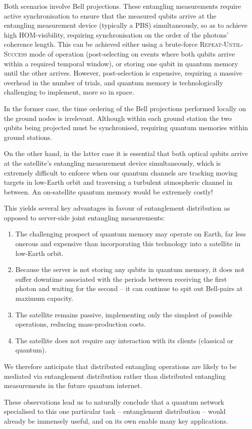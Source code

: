 Both scenarios involve Bell projections. These entangling measurements require active synchronisation to ensure that the measured qubits arrive at the entangling measurement device (typically a PBS) simultaneously, so as to achieve high HOM-visibility, requiring synchronisation on the order of the photons' coherence length. This can be achieved either using a brute-force \textsc{Repeat-Until-Success} mode of operation (post-selecting on events where both qubits arrive within a required temporal window), or storing one qubit in quantum memory until the other arrives. However, post-selection is expensive, requiring a massive overhead in the number of trials, and quantum memory is technologically challenging to implement, more so in space.

In the former case, the time ordering of the Bell projections performed locally on the ground nodes is irrelevant. Although within each ground station the two qubits being projected must be synchronised, requiring quantum memories within ground stations.

On the other hand, in the latter case it is essential that both optical qubits arrive at the satellite's entangling measurement device simultaneously, which is extremely difficult to enforce when our quantum channels are tracking moving targets in low-Earth orbit and traversing a turbulent atmospheric channel in between. An on-satellite quantum memory would be extremely costly!

This yields several key advantages in favour of entanglement distribution as opposed to server-side joint entangling measurements:
\begin{enumerate}
	\item The challenging prospect of quantum memory may operate on Earth, far less onerous and expensive than incorporating this technology into a satellite in low-Earth orbit.
	\item Because the server is not storing any qubits in quantum memory, it does not suffer downtime associated with the periods between receiving the first photon and waiting for the second -- it can continue to spit out Bell-pairs at maximum capacity.
	\item The satellite remains passive, implementing only the simplest of possible operations, reducing mass-production costs.
	\item The satellite does not require any interaction with its clients (classical or quantum).
\end{enumerate}

We therefore anticipate that distributed entangling operations are likely to be mediated via entanglement distribution rather than distributed entangling measurements in the future quantum internet.

These observations lead us to naturally conclude that a quantum network specialised to this one particular task -- entanglement distribution -- would already be immensely useful, and on its own enable many key applications.